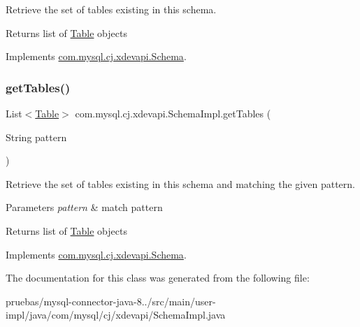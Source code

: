 Retrieve the set of tables existing in this schema.

\begin{DoxyReturn}{Returns}
list of \mbox{\hyperlink{interfacecom_1_1mysql_1_1cj_1_1xdevapi_1_1_table}{Table}} objects 
\end{DoxyReturn}


Implements \mbox{\hyperlink{interfacecom_1_1mysql_1_1cj_1_1xdevapi_1_1_schema_a33149bd057a049634d070e97848b8ca1}{com.\+mysql.\+cj.\+xdevapi.\+Schema}}.

\mbox{\label{classcom_1_1mysql_1_1cj_1_1xdevapi_1_1_schema_impl_ae9ce3609e108dc05f1e4ca978d490b81}} 
\subsubsection{\texorpdfstring{get\+Tables()}{getTables()}\hspace{0.1cm}{\footnotesize\ttfamily [2/2]}}
{\footnotesize\ttfamily List$<$\mbox{\hyperlink{interfacecom_1_1mysql_1_1cj_1_1xdevapi_1_1_table}{Table}}$>$ com.\+mysql.\+cj.\+xdevapi.\+Schema\+Impl.\+get\+Tables (\begin{DoxyParamCaption}\item[{String}]{pattern }\end{DoxyParamCaption})}

Retrieve the set of tables existing in this schema and matching the given pattern.


\begin{DoxyParams}{Parameters}
{\em pattern} & match pattern \\
\hline
\end{DoxyParams}
\begin{DoxyReturn}{Returns}
list of \mbox{\hyperlink{interfacecom_1_1mysql_1_1cj_1_1xdevapi_1_1_table}{Table}} objects 
\end{DoxyReturn}


Implements \mbox{\hyperlink{interfacecom_1_1mysql_1_1cj_1_1xdevapi_1_1_schema_a8d508f1db090e9724dd20ed9375a9b53}{com.\+mysql.\+cj.\+xdevapi.\+Schema}}.



The documentation for this class was generated from the following file\+:\begin{DoxyCompactItemize}
\item 
pruebas/mysql-\/connector-\/java-\/8../src/main/user-\/impl/java/com/mysql/cj/xdevapi/Schema\+Impl.\+java\end{DoxyCompactItemize}
